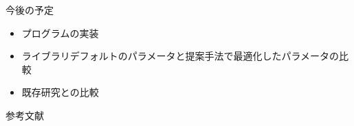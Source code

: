 \documentclass[12pt, cjk, dvipdfmx]{beamer}
\begin{document}
\begin{frame}
\begin{columns}[t]
\begin{column}{0.490\linewidth}
             \begin{mybox}{今後の予定}
               \begin{itemize} 
                 \item プログラムの実装
                 \item ライブラリデフォルトのパラメータと提案手法で最適化したパラメータの比較
                 \item 既存研究との比較
              \end{itemize}
             \end{mybox}
            \begin{mybox}{参考文献}
              \scriptsize
              \begin{description}

\end{description}
\end{mybox}
\end{column}
\end{columns}
\end{frame}
\end{document}
